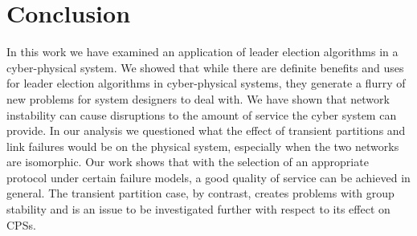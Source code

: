 \chapter{Conclusion}

In this work we have examined an application of leader election algorithms in a cyber-physical system. We showed that while there are definite benefits and uses for leader election algorithms in cyber-physical systems, they generate a flurry of new problems for system designers to deal with. We have shown that network instability can cause disruptions to the amount of service the cyber system can provide. In our analysis we questioned what the effect of transient partitions and link failures would be on the physical system, especially when the two networks are isomorphic. Our work shows that with the selection of an appropriate protocol under certain failure models, a good quality of service can be achieved in general. The transient partition case, by contrast, creates problems with group stability and is an issue to be investigated further with respect to its effect on CPSs.
